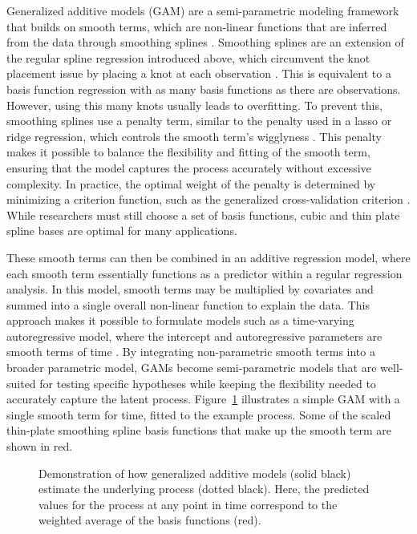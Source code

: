 \documentclass[man, floatsintext]{apa7}
\begin{document}
Generalized additive models (GAM) are a semi-parametric modeling framework
that builds on smooth terms, which are non-linear functions
that are inferred from the data through
smoothing splines \parencite{wood_generalized_2006, wood_inference_2020,
  hastie_generalized_1999}. Smoothing splines are an extension of the regular
spline
regression introduced above, which circumvent the knot placement issue by
placing a knot at each
observation \parencite{tsay_nonlinear_2019}. This is equivalent to a
basis function regression with as many basis functions as there are
observations. However, using this many knots usually leads to overfitting. To
prevent this, smoothing splines use a penalty term, similar to the penalty
used in a lasso or ridge regression, which controls the smooth term's
wigglyness
\parencite{gu_smoothing_2013, wahba_spline_1980}. This penalty makes it
possible to balance the flexibility and fitting of the smooth term,
ensuring that the model captures the process
accurately without excessive complexity. In practice, the optimal weight of the
penalty is
determined by minimizing a criterion function, such as the generalized
cross-validation criterion \parencite{wood_generalized_2006,
  golub_generalized_1997}. While researchers must still choose a set of basis
functions, cubic \parencite{tsay_nonlinear_2019} and thin plate spline bases
\parencite{wood_thin_2003} are optimal for many applications.

These smooth terms can then be combined in an additive regression model, where
each smooth term essentially functions as a predictor within a regular
regression
analysis. In this model, smooth terms may be multiplied by covariates and
summed into a single overall non-linear function to explain the data. This
approach makes it possible to formulate models such as a time-varying
autoregressive model, where the intercept and autoregressive parameters are
smooth terms of time \parencite{bringmann_changing_2017,
  bringmann_modeling_2015}. By integrating non-parametric smooth terms into a
broader parametric model, GAMs become semi-parametric models that are
well-suited for testing specific hypotheses while keeping the flexibility
needed to accurately capture the latent process. Figure~\ref{fig:gam_dem}
illustrates a simple GAM with a single smooth term for time, fitted to the
example process. Some of the scaled thin-plate smoothing spline basis
functions that make up the smooth term are shown in red.

\begin{figure}[!ht]
  \caption{Demonstration of how generalized additive models (solid black)
    estimate the underlying process (dotted black). Here, the predicted values
    for the process at any point in time correspond to the weighted average of
    the basis functions (red).}
  \label{fig:gam_dem}
\end{figure}
\end{document}
